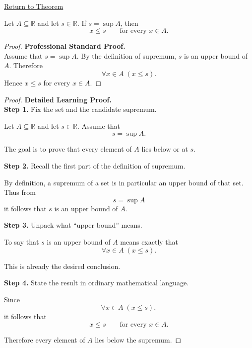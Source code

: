\newpage
{}
\label{prf:upper-bound-property-of-supremum}

\begin{remark*}[Return]
\hyperref[prop:upper-bound-property-of-supremum]{Return to Theorem}
\end{remark*}

\begin{theorem*}
Let $A \subseteq \mathbb{R}$ and let $s \in \mathbb{R}$. If $s=\sup A$, then
\[
x \le s
\qquad \text{for every } x \in A.
\]
\end{theorem*}

\begin{proof}
\textbf{Professional Standard Proof.}~\\
Assume that $s=\sup A$. By the definition of supremum, $s$ is an upper bound of $A$. Therefore
\[
\forall x \in A \; (x \le s).
\]
Hence $x \le s$ for every $x \in A$.
\end{proof}

\begin{proof}
\textbf{Detailed Learning Proof.}~\\

\textbf{Step 1.} Fix the set and the candidate supremum.

Let $A \subseteq \mathbb{R}$ and let $s \in \mathbb{R}$. Assume that
\[
s=\sup A.
\]

The goal is to prove that every element of $A$ lies below or at $s$.

\textbf{Step 2.} Recall the first part of the definition of supremum.

By definition, a supremum of a set is in particular an upper bound of that set. Thus from
\[
s=\sup A
\]
it follows that $s$ is an upper bound of $A$.

\textbf{Step 3.} Unpack what “upper bound” means.

To say that $s$ is an upper bound of $A$ means exactly that
\[
\forall x \in A \; (x \le s).
\]

This is already the desired conclusion.

\textbf{Step 4.} State the result in ordinary mathematical language.

Since
\[
\forall x \in A \; (x \le s),
\]
it follows that
\[
x \le s
\qquad \text{for every } x \in A.
\]

Therefore every element of $A$ lies below the supremum.
\end{proof}

